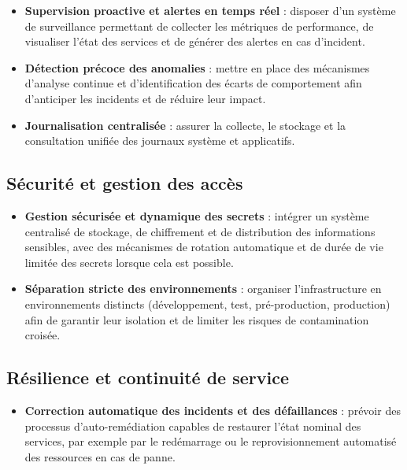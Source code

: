 \begin{itemize}
	\item \textbf{Supervision proactive et alertes en temps réel} : disposer d'un système de surveillance permettant de collecter les métriques de performance, de visualiser l'état des services et de générer des alertes en cas d'incident.

	\item \textbf{Détection précoce des anomalies} : mettre en place des mécanismes d'analyse continue et d'identification des écarts de comportement afin d'anticiper les incidents et de réduire leur impact.

	\item \textbf{Journalisation centralisée} : assurer la collecte, le stockage et la consultation unifiée des journaux système et applicatifs.
\end{itemize}

\subsection*{Sécurité et gestion des accès}

\begin{itemize}
	\item \textbf{Gestion sécurisée et dynamique des secrets} : intégrer un système centralisé de stockage, de chiffrement et de distribution des informations sensibles, avec des mécanismes de rotation automatique et de durée de vie limitée des secrets lorsque cela est possible.

	\item \textbf{Séparation stricte des environnements} : organiser l'infrastructure en environnements distincts (développement, test, pré-production, production) afin de garantir leur isolation et de limiter les risques de contamination croisée.
\end{itemize}

\subsection*{Résilience et continuité de service}

\begin{itemize}
	\item \textbf{Correction automatique des incidents et des défaillances} : prévoir des processus d'auto-remédiation capables de restaurer l'état nominal des services, par exemple par le redémarrage ou le reprovisionnement automatisé des ressources en cas de panne.
\end{itemize}

